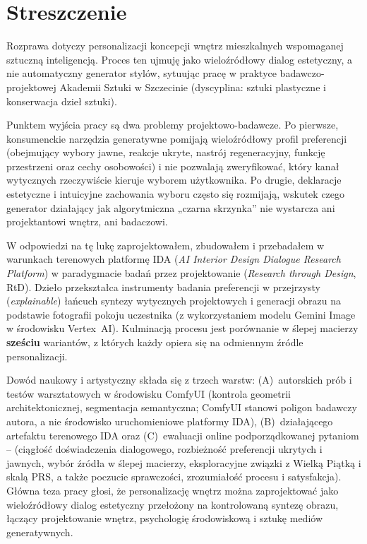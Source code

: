 \chapter*{Streszczenie}

Rozprawa dotyczy personalizacji koncepcji wnętrz mieszkalnych wspomaganej sztuczną inteligencją. Proces ten ujmuję jako wieloźródłowy dialog estetyczny, a nie automatyczny generator stylów, sytuując pracę w praktyce badawczo-projektowej Akademii Sztuki w Szczecinie (dyscyplina: sztuki plastyczne i konserwacja dzieł sztuki).

Punktem wyjścia pracy są dwa problemy projektowo-badawcze. Po pierwsze, konsumenckie narzędzia generatywne pomijają wieloźródłowy profil preferencji (obejmujący wybory jawne, reakcje ukryte, nastrój regeneracyjny, funkcję przestrzeni oraz cechy osobowości) i nie pozwalają zweryfikować, który kanał wytycznych rzeczywiście kieruje wyborem użytkownika. Po drugie, deklaracje estetyczne i intuicyjne zachowania wyboru często się rozmijają, wskutek czego generator działający jak algorytmiczna „czarna skrzynka” nie wystarcza ani projektantowi wnętrz, ani badaczowi.

W odpowiedzi na tę lukę zaprojektowałem, zbudowałem i przebadałem w warunkach terenowych platformę IDA (\emph{AI Interior Design Dialogue Research Platform}) w paradygmacie badań przez projektowanie (\emph{Research through Design}, RtD). Dzieło przekształca instrumenty badania preferencji w przejrzysty (\emph{explainable}) łańcuch syntezy wytycznych projektowych i generacji obrazu na podstawie fotografii pokoju uczestnika (z wykorzystaniem modelu Gemini Image w środowisku Vertex~AI). Kulminacją procesu jest porównanie w ślepej macierzy \textbf{sześciu} wariantów, z których każdy opiera się na odmiennym źródle personalizacji.

Dowód naukowy i artystyczny składa się z trzech warstw: (A)~autorskich prób i testów warsztatowych w środowisku ComfyUI (kontrola geometrii architektonicznej, segmentacja semantyczna; ComfyUI stanowi poligon badawczy autora, a nie środowisko uruchomieniowe platformy IDA), (B)~działającego artefaktu terenowego IDA oraz (C)~ewaluacji online podporządkowanej pytaniom -- (ciągłość doświadczenia dialogowego, rozbieżność preferencji ukrytych i jawnych, wybór źródła w ślepej macierzy, eksploracyjne związki z Wielką Piątką i skalą PRS, a także poczucie sprawczości, zrozumiałość procesu i satysfakcja). Główna teza pracy głosi, że personalizację wnętrz można zaprojektować jako wieloźródłowy dialog estetyczny przełożony na kontrolowaną syntezę obrazu, łączący projektowanie wnętrz, psychologię środowiskową i sztukę mediów generatywnych.

